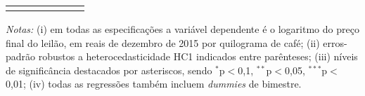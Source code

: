 \begin{table}[!htbp]
\begin{threeparttable}
\begin{tabular}{lcccccc}
\hline \\[-1.8ex] 
\end{tabular} 
\begin{tablenotes}
\footnotesize
\emph{Notas:} (i) em todas as especificações a variável dependente é o logaritmo do preço final do leilão, em reais de dezembro de 2015 por quilograma de café; (ii) erros-padrão robustos a heterocedasticidade HC1 indicados entre parênteses; (iii) níveis de significância destacados por asteriscos, sendo  $^{*}$p$<$0,1, $^{**}$p$<$0,05, $^{***}$p$<$0,01; (iv) todas as regressões também incluem \textit{dummies} de bimestre.\\ 
\end{tablenotes}
\end{threeparttable}
\end{table} 